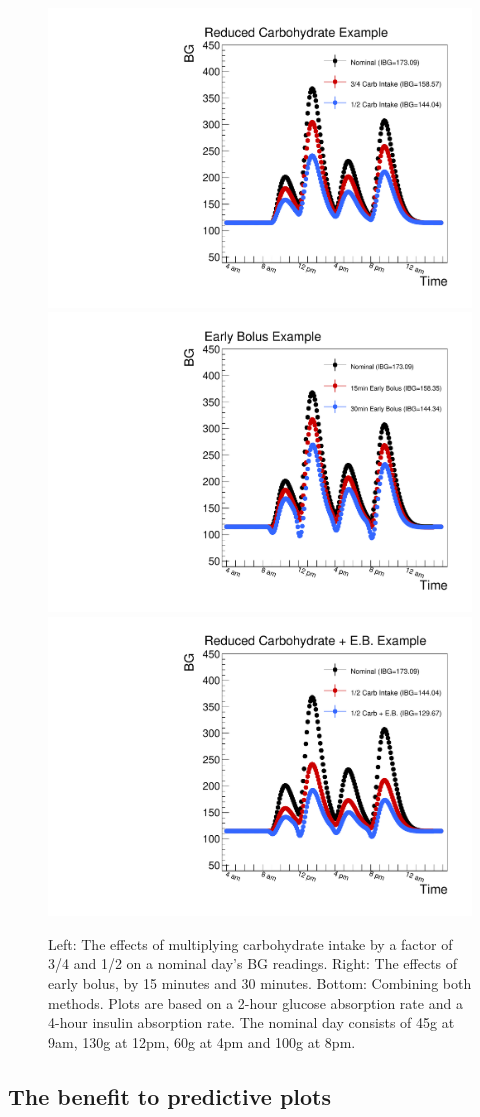 \begin{figure}[htbp]
\begin{center}
\includegraphics[width=3.in]{figures/reduced_carb.pdf}
\includegraphics[width=3.in]{figures/early_bolus.pdf}
\includegraphics[width=3.in]{figures/reduced_carb_eb.pdf}
\caption{Left: The effects of multiplying carbohydrate intake by a factor of 3/4 and 1/2 on a
nominal day's BG readings.
Right: The effects of early bolus, by 15 minutes and 30 minutes. Bottom: Combining both methods.
Plots are based on a 2-hour glucose absorption rate and a 4-hour insulin absorption rate.
The nominal day consists of 45g at 9am, 130g at 12pm, 60g at 4pm and 100g at 8pm. }
\label{fig:reduceCarb_eb}
\end{center}
\end{figure}

\clearpage

\subsection{The benefit to predictive plots}

